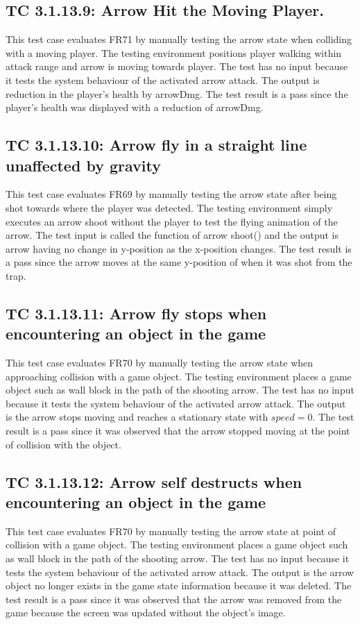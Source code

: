\documentclass[12pt, titlepage]{article}
\begin{document}
\subsection*{TC 3.1.13.9: Arrow Hit the Moving Player.}
This test case evaluates FR71 by manually testing the arrow state when colliding with a moving player. The testing environment positions player walking within attack range and arrow is moving towards player. The test has no input because it tests the system behaviour of the activated arrow attack. The output is reduction in the player's health by arrowDmg. The test result is a pass since the player's health was displayed with a reduction of arrowDmg. 

\subsection*{TC 3.1.13.10: Arrow fly in a straight line unaffected by gravity}
This test case evaluates FR69 by manually testing the arrow state after being shot towards where the player was detected. The testing environment simply executes an arrow shoot without the player to test the flying animation of the arrow. The test input is called the function of arrow shoot() and the output is arrow having no change in y-position as the x-position changes. The test result is a pass since the arrow moves at the same y-position of when it was shot from the trap. 

\subsection*{TC 3.1.13.11: Arrow  fly  stops  when  encountering  an  object  in  the game}
This test case evaluates FR70 by manually testing the arrow state when approaching collision with a game object. The testing environment places a game object such as wall block in the path of the shooting arrow. The test has no input because it tests the system behaviour of the activated arrow attack. The output is the arrow stops moving and reaches a stationary state with $speed=0$. The test result is a pass since it was observed that the arrow stopped moving at the point of collision with the object.

\subsection*{TC 3.1.13.12: Arrow self destructs when encountering an object in the game}
This test case evaluates FR70 by manually testing the arrow state at point of collision with a game object. The testing environment places a game object such as wall block in the path of the shooting arrow. The test has no input because it tests the system behaviour of the activated arrow attack. The output is the arrow object no longer exists in the game state information because it was deleted. The test result is a pass since it was observed that the arrow was removed from the game because the screen was updated without the object's image.
\end{document}
